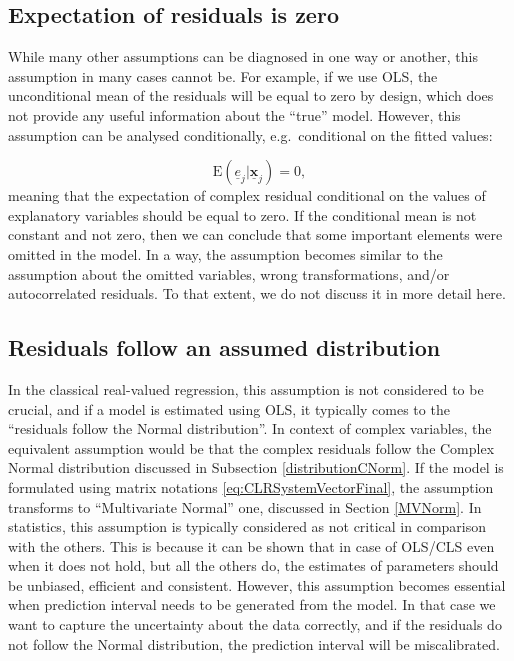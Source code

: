 \documentclass[
]{book}
\begin{document}
\hypertarget{expectation-of-residuals-is-zero}{%
\subsection{Expectation of residuals is zero}\label{expectation-of-residuals-is-zero}}

While many other assumptions can be diagnosed in one way or another, this assumption in many cases cannot be. For example, if we use OLS, the unconditional mean of the residuals will be equal to zero by design, which does not provide any useful information about the ``true'' model. However, this assumption can be analysed conditionally, e.g.~conditional on the fitted values:

\begin{equation}
    \mathrm{E}(\underline{e}_j | \underline{\mathbf{x}}_j)=0 ,
    \label{eq:residsExpectation}
\end{equation}
meaning that the expectation of complex residual conditional on the values of explanatory variables should be equal to zero. If the conditional mean is not constant and not zero, then we can conclude that some important elements were omitted in the model. In a way, the assumption becomes similar to the assumption about the omitted variables, wrong transformations, and/or autocorrelated residuals. To that extent, we do not discuss it in more detail here.

\hypertarget{residuals-follow-an-assumed-distribution}{%
\subsection{Residuals follow an assumed distribution}\label{residuals-follow-an-assumed-distribution}}

In the classical real-valued regression, this assumption is not considered to be crucial, and if a model is estimated using OLS, it typically comes to the ``residuals follow the Normal distribution''. In context of complex variables, the equivalent assumption would be that the complex residuals follow the Complex Normal distribution discussed in Subsection \ref{distributionCNorm}. If the model is formulated using matrix notations \eqref{eq:CLRSystemVectorFinal}, the assumption transforms to ``Multivariate Normal'' one, discussed in Section \ref{MVNorm}. In statistics, this assumption is typically considered as not critical in comparison with the others. This is because it can be shown that in case of OLS/CLS even when it does not hold, but all the others do, the estimates of parameters should be unbiased, efficient and consistent. However, this assumption becomes essential when prediction interval needs to be generated from the model. In that case we want to capture the uncertainty about the data correctly, and if the residuals do not follow the Normal distribution, the prediction interval will be miscalibrated.
\end{document}
